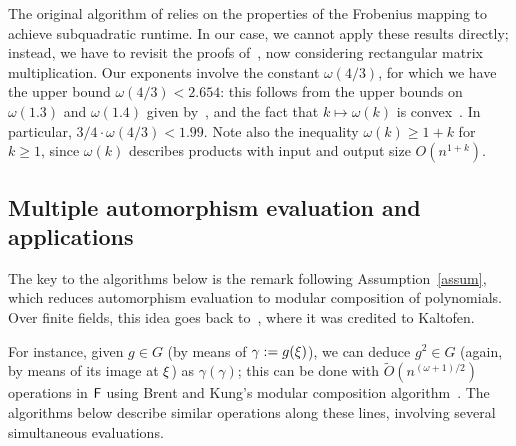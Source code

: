The original algorithm of \cite{KalSho98} relies on the properties of
the Frobenius mapping to achieve subquadratic runtime. In our case, we
cannot apply these results directly; instead, we have to revisit the
proofs of~\cite[Lemmata 3 and 4]{KalSho98}, now considering
rectangular matrix multiplication.  Our exponents involve the constant
$\omega(4/3)$, for which we have the upper bound $\omega(4/3) <
2.654$: this follows from the upper bounds on $\omega(1.3)$ and
$\omega(1.4)$ given by~\cite{LeGall}, and the fact that $k \mapsto
\omega(k)$ is convex~\citep{LoRo83}. In particular, $3/4 \cdot
\omega(4/3) < 1.99$. Note also the inequality $\omega(k) \ge 1+k$ for
$k\ge 1$, since $\omega(k)$ describes products with input and output
size $O(n^{1+k})$.


\subsection{Multiple automorphism evaluation and applications}

The key to the algorithms below is the remark following
Assumption~\ref{assum}, which reduces automorphism evaluation to
modular composition of polynomials.  Over finite fields, this idea goes back
to~\cite{GaSh92}, where it was credited to Kaltofen.

For instance, given $g \in G$ (by means of $\gamma:=g(\xi)$), we can
deduce $g^2 \in G$ (again, by means of its image at $\xi$) as
$\gamma(\gamma)$; this can be done with $\tilde{O}(n^{(\omega+1)/2})$
operations in ${\mathsf{F}}$ using Brent and Kung's modular composition
algorithm~\citep{BrKu78}. The algorithms below describe similar operations
along these lines, involving several simultaneous evaluations.

